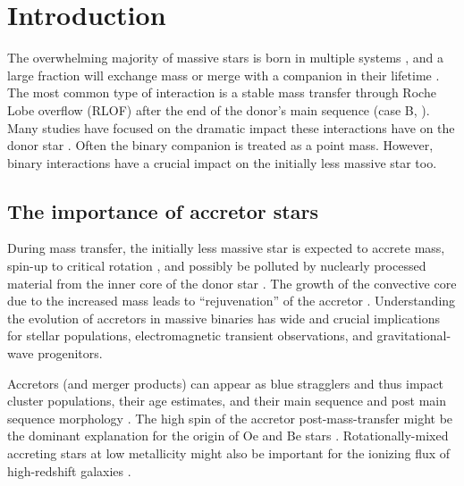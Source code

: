 \documentclass[twocolumn,twocolappendix,trackchanges]{aastex63}
\newcommand{\todo}[1]{{\large $\blacksquare$~\textbf{\color{red}[#1]}}~$\blacksquare$}
\begin{document}
\section{Introduction}
\label{sec:intro}


The overwhelming majority of massive stars is born in multiple systems
\citep[e.g.,][]{mason:09, almeida:17, moe:17}, and a large fraction will
exchange mass or merge with a companion in their lifetime
\citep[e.g.,][]{sana:12}. The most common type of interaction is a
stable mass transfer through Roche Lobe overflow (RLOF) after the end of the donor's main sequence (case
B, \citealt{kippenhahn:67}).  Many
studies %
have focused on the dramatic impact these interactions have on the
donor star \citep[e.g.,][]{morton:60, yoon:17, gotberg:17, gotberg:18, laplace:20,
  laplace:21, blagorodnova:21}. Often the binary companion is treated as a point mass.
However, binary interactions have a crucial impact on the initially
less massive star too.

\subsection{The importance of accretor stars}

During mass transfer, the initially less massive star is expected to
accrete mass, spin-up to critical rotation \citep[e.g.,][]{packet:81},
and possibly be polluted by nuclearly processed material from the
inner core of the donor star \citep[e.g.,][]{blaauw:93}. The growth of
the convective core due to the increased mass leads to
``rejuvenation'' of the accretor \citep[e.g.,][]{neo:77,
  schneider:16}. Understanding the evolution of accretors in massive
binaries has wide and crucial implications for stellar populations,
electromagnetic transient observations, and gravitational-wave
progenitors.

Accretors
(and merger products) can appear as blue stragglers
\citep[e.g.,][]{chen:09, chen:10, rain:21} and thus impact cluster
populations, their age estimates, and their main sequence
\citep[e.g.,][]{pols_marinus:94, wang:20} and post main sequence morphology
\citep[e.g.,][]{wei:21}. The high spin of the
accretor post-mass-transfer might be the dominant explanation for the origin of
Oe and Be stars \citep[i.e., stars showing emission lines, e.g.,][]{pols:91, bodensteiner:20,
  vinciguerra:20, dorigo-jones:20, wang:21_sdOBe}. Rotationally-mixed accreting
stars at low metallicity might also be important for the ionizing flux of high-redshift
galaxies \citep[e.g.,][]{eldridge:12}.
\end{document}

